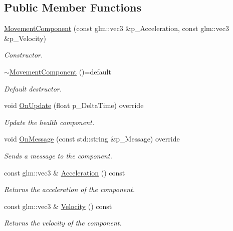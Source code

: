 \subsection*{Public Member Functions}
\begin{DoxyCompactItemize}
\item 
\mbox{\hyperlink{class_movement_component_a63eff0fd15a701acc43d36d14b2e0464}{Movement\+Component}} (const glm\+::vec3 \&p\+\_\+\+Acceleration, const glm\+::vec3 \&p\+\_\+\+Velocity)
\begin{DoxyCompactList}\small\item\em Constructor. \end{DoxyCompactList}\item 
\mbox{\label{class_movement_component_aa085776b1411135b420c72a2226cad4a}} 
\mbox{\hyperlink{class_movement_component_aa085776b1411135b420c72a2226cad4a}{$\sim$\+Movement\+Component}} ()=default
\begin{DoxyCompactList}\small\item\em Default destructor. \end{DoxyCompactList}\item 
void \mbox{\hyperlink{class_movement_component_aa7d58780fe672dc910896c53aa4da7fd}{On\+Update}} (float p\+\_\+\+Delta\+Time) override
\begin{DoxyCompactList}\small\item\em Update the health component. \end{DoxyCompactList}\item 
void \mbox{\hyperlink{class_movement_component_aa82c5ab1af1d6bf286f264ad760e1e30}{On\+Message}} (const std\+::string \&p\+\_\+\+Message) override
\begin{DoxyCompactList}\small\item\em Sends a message to the component. \end{DoxyCompactList}\item 
\mbox{\label{class_movement_component_aa8571c644ab0b1d48c6659fd4960bee0}} 
const glm\+::vec3 \& \mbox{\hyperlink{class_movement_component_aa8571c644ab0b1d48c6659fd4960bee0}{Acceleration}} () const
\begin{DoxyCompactList}\small\item\em Returns the acceleration of the component. \end{DoxyCompactList}\item 
\mbox{\label{class_movement_component_afe25557004eb190c4e4ce696c045f7e0}} 
const glm\+::vec3 \& \mbox{\hyperlink{class_movement_component_afe25557004eb190c4e4ce696c045f7e0}{Velocity}} () const
\begin{DoxyCompactList}\small\item\em Returns the velocity of the component. \end{DoxyCompactList}\end{DoxyCompactItemize}



